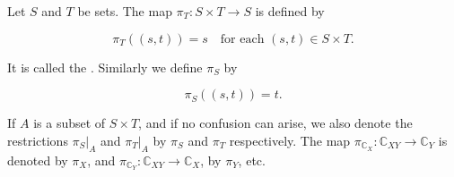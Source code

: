 Let $S$ and $T$ be sets. The map $\pi_T \colon S \times T \to S$ is defined by

$$
\pi_T((s, t)) = s \quad \text{for each } (s, t) \in S \times T.
$$

It is called the . Similarly we define $\pi_S$ by

$$
\pi_S((s, t)) = t.
$$

If $A$ is a subset of $S \times T$, and if no confusion can arise, we also denote the restrictions $\pi_S|_{A}$ and $\pi_T|_{A}$ by $\pi_S$ and $\pi_T$ respectively. The map $\pi_{\mathbb{C}_X} \colon \mathbb{C}_{XY} \to \mathbb{C}_Y$ is denoted by $\pi_X$, and $\pi_{\mathbb{C}_Y} \colon \mathbb{C}_{XY} \to \mathbb{C}_X$, by $\pi_Y$, etc.
